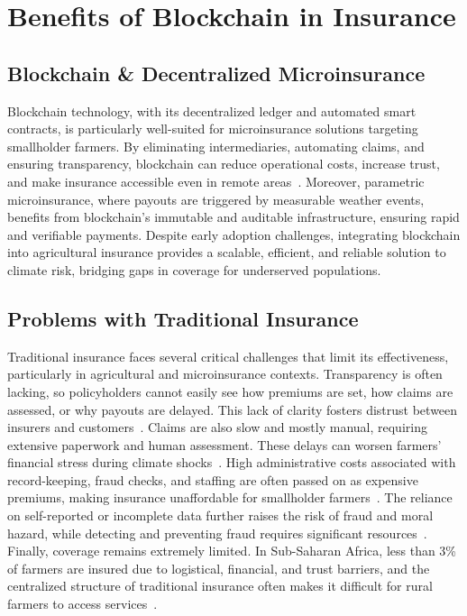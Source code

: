 \documentclass[11pt,a4paper]{article}
\begin{document}
		\section{Benefits of Blockchain in Insurance}\label{sec:benefits}

		\subsection{Blockchain \& Decentralized Microinsurance}\label{subsec:blockchain-&-decentralized-microinsurance}
		Blockchain technology, with its decentralized ledger and automated smart contracts, is particularly well-suited for microinsurance solutions targeting smallholder farmers.
		By eliminating intermediaries, automating claims, and ensuring transparency, blockchain can reduce operational costs, increase trust, and make insurance accessible even in remote areas~\parencite{DominguezAnguianoParte2024, Shetty2022}.
		Moreover, parametric microinsurance, where payouts are triggered by measurable weather events, benefits from blockchain's immutable and auditable infrastructure, ensuring rapid and verifiable payments.
		Despite early adoption challenges, integrating blockchain into agricultural insurance provides a scalable, efficient, and reliable solution to climate risk, bridging gaps in coverage for underserved populations.

		\subsection{Problems with Traditional Insurance}\label{subsec:problems-with-traditional-insurance}
		Traditional insurance faces several critical challenges that limit its effectiveness, particularly in agricultural and microinsurance contexts.
		Transparency is often lacking, so policyholders cannot easily see how premiums are set, how claims are assessed, or why payouts are delayed.
		This lack of clarity fosters distrust between insurers and customers~\parencite{DominguezAnguianoParte2024}.
		Claims are also slow and mostly manual, requiring extensive paperwork and human assessment.
		These delays can worsen farmers' financial stress during climate shocks~\parencite{Chainlink2021, Shetty2022}.
		High administrative costs associated with record-keeping, fraud checks, and staffing are often passed on as expensive premiums, making insurance unaffordable for smallholder farmers~\parencite{DominguezAnguianoParte2024}.
		The reliance on self-reported or incomplete data further raises the risk of fraud and moral hazard, while detecting and preventing fraud requires significant resources~\parencite{Chainlink2021, Shetty2022}.
		Finally, coverage remains extremely limited.
		In Sub-Saharan Africa, less than 3\% of farmers are insured due to logistical, financial, and trust barriers, and the centralized structure of traditional insurance often makes it difficult for rural farmers to access services~\parencite{Alsdorf2024, WorldBank2022}.
\end{document}

